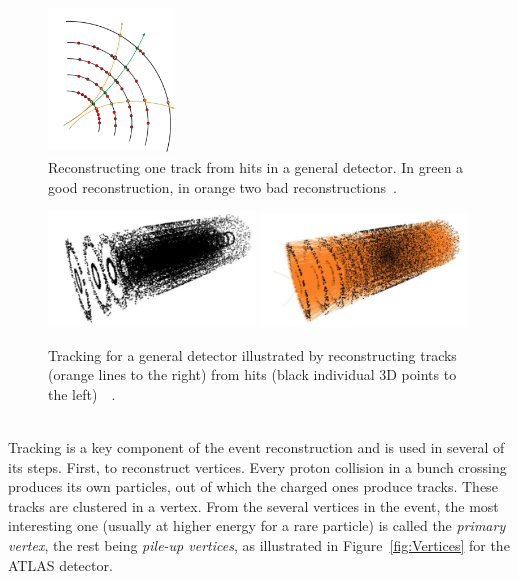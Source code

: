 \begin{figure}[!htb]
\centering
\includegraphics[width=0.30\textwidth]{./plots/TrackReconstruction.png}
\caption{Reconstructing one track from hits in a general detector. In green a good reconstruction, in orange two bad reconstructions~\cite{TrackMLPPTBefore}.}
\label{fig:FromHitsToTracks}
\end{figure}

\begin{figure}[!htb]
\centering
\includegraphics[width=0.49\textwidth]{./plots/Hits.png}
\includegraphics[width=0.49\textwidth]{./plots/Tracks.png}
\caption{Tracking for a general detector illustrated by reconstructing tracks (orange lines to the right) from hits (black individual 3D points to the left)~\cite{TrackMLPPTAfter}~\cite{TrackMLPPTAfter2}.}
\label{fig:FromHitsToTracks2}
\end{figure}

\ \\Tracking is a key component of the event reconstruction and is used in several of its steps. First, to reconstruct vertices. Every proton collision in a bunch crossing produces its own particles, out of which the charged ones produce tracks. These tracks are clustered in a vertex. From the several vertices in the event, the most interesting one (usually at higher energy for a rare particle) is called the \emph{primary vertex}, the rest being \emph{pile-up vertices}, as illustrated in Figure~\ref{fig:Vertices} for the ATLAS detector. 

